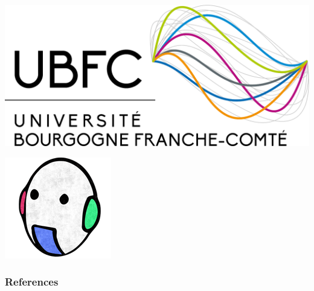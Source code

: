 \documentclass[9pt, aspectratio=169]{beamer}
\begin{document}
\begin{frame}[plain,c]
\begin{minipage}{0.49\textwidth}
{	\begin{minipage}{0.45\linewidth}
			\centering
			\includegraphics[width=0.7\linewidth]{images/logos/ubfc}
	\end{minipage}\hfill
	\begin{minipage}{0.45\linewidth}
			\centering
			\includegraphics[width=0.5\linewidth]{images/logos/vibot}	
	\end{minipage}
	}
	\end{minipage}
\end{frame}





%
%
%

\begin{frame}[plain]
\frametitle{References}

\scriptsize{}

\end{frame}

\appendix
\end{document}
